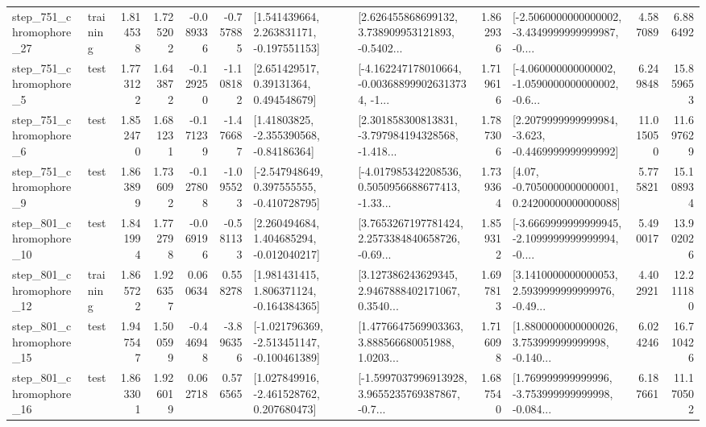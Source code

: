 \begin{tabular}{llrrrrllrlrr}
  step\_751\_chromophore\_27 &  training &      1.814538 &    1.725202 &     -0.089336 & -0.757885 &    [1.541439664, 2.263831171, -0.197551153] &  [2.626455868699132, 3.738909953121893, -0.5402... &       1.862936 &  [-2.5060000000000002, -3.4349999999999987, -0.... &            4.587089 &          6.886492 \\
   step\_751\_chromophore\_5 &      test &      1.773122 &    1.643872 &     -0.129250 & -1.108182 &      [2.651429517, 0.39131364, 0.494548679] &  [-4.162247178010664, -0.003688999026313734, -1... &       1.719616 &  [-4.060000000000002, -1.0590000000000002, -0.6... &            6.249848 &         15.859653 \\
   step\_751\_chromophore\_6 &      test &      1.852470 &    1.681231 &     -0.171239 & -1.476687 &     [1.41803825, -2.355390568, -0.84186364] &  [2.301858300813831, -3.797984194328568, -1.418... &       1.787306 &  [2.2079999999999984, -3.623, -0.4469999999999992] &           11.015050 &         11.697629 \\
   step\_751\_chromophore\_9 &      test &      1.863899 &    1.736092 &     -0.127808 & -1.095523 &   [-2.547948649, 0.397555555, -0.410728795] &  [-4.017985342208536, 0.5050956688677413, -1.33... &       1.739364 &   [4.07, -0.7050000000000001, 0.24200000000000088] &            5.775821 &         15.108934 \\
  step\_801\_chromophore\_10 &      test &      1.841994 &    1.772798 &     -0.069196 & -0.581133 &    [2.260494684, 1.404685294, -0.012040217] &  [3.7653267197781424, 2.2573384840658726, -0.69... &       1.859312 &  [-3.6669999999999945, -2.1099999999999994, -0.... &            5.490017 &         13.902026 \\
  step\_801\_chromophore\_12 &  training &      1.865722 &    1.926357 &      0.060634 &  0.558278 &    [1.981431415, 1.806371124, -0.164384365] &  [3.127386243629345, 2.9467888402171067, 0.3540... &       1.697813 &  [3.1410000000000053, 2.5939999999999976, -0.49... &            4.402921 &         12.211180 \\
  step\_801\_chromophore\_15 &      test &      1.947547 &    1.500599 &     -0.446948 & -3.896356 &  [-1.021796369, -2.513451147, -0.100461389] &  [1.4776647569903363, 3.888566680051988, 1.0203... &       1.716098 &  [1.8800000000000026, 3.753999999999998, -0.140... &            6.024246 &         16.710426 \\
  step\_801\_chromophore\_16 &      test &      1.863301 &    1.926019 &      0.062718 &  0.576565 &    [1.027849916, -2.461528762, 0.207680473] &  [-1.5997037996913928, 3.9655235769387867, -0.7... &       1.687540 &  [1.769999999999996, -3.753999999999998, -0.084... &            6.187661 &         11.170502 \\

\end{tabular}
